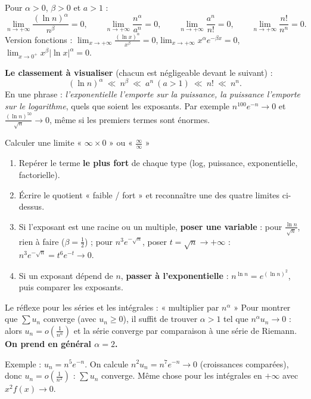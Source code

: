 \documentclass[a4paper,10pt]{article}
\begin{document}
\begin{FORM}
Pour $\alpha>0$, $\beta>0$ et $a>1$ :
\[\lim_{n\to+\infty}\frac{(\ln n)^\alpha}{n^\beta}=0,\qquad\lim_{n\to+\infty}\frac{n^\alpha}{a^n}=0,\qquad\lim_{n\to+\infty}\frac{a^n}{n!}=0,\qquad\lim_{n\to+\infty}\frac{n!}{n^n}=0.\]
Version fonctions : $\displaystyle\lim_{x\to+\infty}\frac{(\ln x)^\alpha}{x^\beta}=0$,\quad $\displaystyle\lim_{x\to+\infty}x^\alpha e^{-\beta x}=0$,\quad
$\displaystyle\lim_{x\to0^+}x^\beta|\ln x|^\alpha=0$.
\end{FORM}

\textbf{Le classement à visualiser} (chacun est négligeable devant le suivant) :
\[(\ln n)^\alpha\ \ll\ n^\beta\ \ll\ a^n\ (a>1)\ \ll\ n!\ \ll\ n^n.\]
En une phrase : \emph{l'exponentielle l'emporte sur la puissance, la puissance l'emporte sur le logarithme}, quels que soient les
exposants. Par exemple $n^{100}e^{-n}\to0$ et $\frac{(\ln n)^{50}}{\sqrt n}\to0$, même si les premiers termes sont énormes.

\begin{METH}{Calculer une limite « $\infty\times0$ » ou « $\frac\infty\infty$ »}
\begin{enumerate}
\item Repérer le terme \textbf{le plus fort} de chaque type (log, puissance, exponentielle, factorielle).
\item Écrire le quotient « faible / fort » et reconnaître une des quatre limites ci-dessus.
\item Si l'exposant est une racine ou un multiple, \textbf{poser une variable} : pour $\frac{\ln n}{\sqrt n}$, rien à faire ($\beta=\frac12$) ;
pour $n^3e^{-\sqrt n}$, poser $t=\sqrt n\to+\infty$ : $n^3e^{-\sqrt n}=t^6e^{-t}\to0$.
\item Si un exposant dépend de $n$, \textbf{passer à l'exponentielle} : $n^{\ln n}=e^{(\ln n)^2}$, puis comparer les exposants.
\end{enumerate}
\end{METH}

\begin{METH}{Le réflexe pour les séries et les intégrales : « multiplier par $n^\alpha$ »}
Pour montrer que $\sum u_n$ converge (avec $u_n\geq0$), il suffit de trouver $\alpha>1$ tel que $n^\alpha u_n\to0$ : alors
$u_n=o\left(\frac1{n^\alpha}\right)$ et la série converge par comparaison à une série de Riemann. \textbf{On prend en général $\alpha=2$.}

Exemple : $u_n=n^5e^{-n}$. On calcule $n^2u_n=n^7e^{-n}\to0$ (croissances comparées), donc $u_n=o\left(\frac1{n^2}\right)$ : $\sum u_n$
converge. Même chose pour les intégrales en $+\infty$ avec $x^2f(x)\to0$.
\end{METH}
\end{document}
